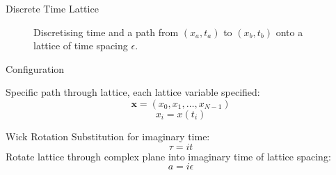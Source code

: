 \documentclass{beamer}
\begin{document}
\begin{frame}{Discrete Time Lattice}
{\begin{figure}
            \caption{Discretising time and a path from $\left(x_a,t_a\right)$ to $\left(x_b,t_b\right)$  onto a lattice of time spacing $\epsilon$.}
            \label{fig:TimeLattice}
        \end{figure}
        }
        
        {
            \begin{block}{Configuration}
            {
                Specific path through lattice, each lattice variable specified:
                \begin{equation*}
                    \label{eq:Configuration}
                        \bm{x} = \left(x_0,x_1,\dots,x_{N-1}\right)
                \end{equation*}
                \begin{equation*}
                    \label{eq:SiteNotation}
                        x_i=x\left(t_i\right)
                \end{equation*}
                
            }
            \end{block}
        {
            \begin{block}{Wick Rotation}
                {
                    Substitution for imaginary time:
                    \begin{equation*}
                    \label{eq:WickRotation}
                        \tau = it 
                    \end{equation*}
                }
                {   Rotate lattice through complex plane into imaginary time of lattice spacing:
                    \begin{equation*}
                        \label{eq:WickRotationLattice}
                        a = i \epsilon
                    \end{equation*}
                }
            

\end{block}}}
\end{frame}
\end{document}
